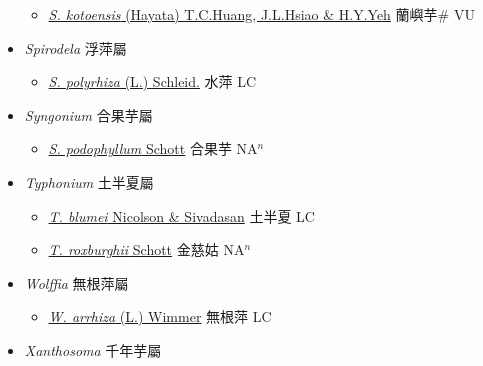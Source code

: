 \begin{itemize}
  \begin{itemize}
        \item[] \href{http://www.theplantlist.org/tpl1.1/search?q=Schismatoglottis+kotoensis}{\textit{S. kotoensis} (Hayata) T.C.Huang, J.L.Hsiao \& H.Y.Yeh}   蘭嶼芋\# VU
  \end{itemize}
 \item[] \textit{Spirodela} 浮萍屬
                    
  \begin{itemize}
        \item[] \href{http://www.theplantlist.org/tpl1.1/search?q=Spirodela+polyrhiza}{\textit{S. polyrhiza} (L.) Schleid.}   水萍 LC
  \end{itemize}
 \item[] \textit{Syngonium} 合果芋屬
                    
  \begin{itemize}
        \item[] \href{http://www.theplantlist.org/tpl1.1/search?q=Syngonium+podophyllum}{\textit{S. podophyllum} Schott}   合果芋 NA$^n$
  \end{itemize}
 \item[] \textit{Typhonium} 土半夏屬
                    
  \begin{itemize}
        \item[] \href{http://www.theplantlist.org/tpl1.1/search?q=Typhonium+blumei}{\textit{T. blumei} Nicolson \& Sivadasan}   土半夏 LC
        \item[] \href{http://www.theplantlist.org/tpl1.1/search?q=Typhonium+roxburghii}{\textit{T. roxburghii} Schott}   金慈姑 NA$^n$
  \end{itemize}
 \item[] \textit{Wolffia} 無根萍屬
                    
  \begin{itemize}
        \item[] \href{http://www.theplantlist.org/tpl1.1/search?q=Wolffia+arrhiza}{\textit{W. arrhiza} (L.) Wimmer}   無根萍 LC
  \end{itemize}
 \item[] \textit{Xanthosoma} 千年芋屬
                    

\end{itemize}
